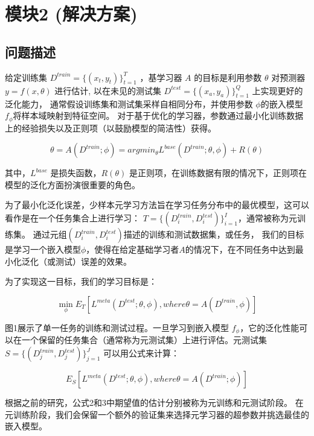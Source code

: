 \chapter{模块2 (解决方案)}


\section{问题描述}

给定训练集 $D^{train} = \{(x_t,y_t)\}^{T}_{t=1}$ ，基学习器 $A$ 的目标是利用参数 $\theta$ 对预测器 $y=f(x,\theta)$ 进行估计,
以在未见的测试集 $D^{test} = \{(x_a, y_a)\}^{Q}_{t=1}$ 上实现更好的泛化能力，
通常假设训练集和测试集采样自相同分布，并使用参数 $\phi$的嵌入模型$f_{\phi}$将样本域映射到特征空间。
对于基于优化的学习器，参数通过最小化训练数据上的经验损失以及正则项（以鼓励模型的简洁性）获得。

\begin{equation}
    \theta = A(D^{train}; \phi) = argmin_{\theta}L^{base}(D^{train}; \theta, \phi) + R(\theta)
\end{equation}

其中，$L^{base}$ 是损失函数，$R(\theta)$ 是正则项，在训练数据有限的情况下，正则项在模型的泛化方面扮演很重要的角色。

为了最小化泛化误差，少样本元学习方法旨在学习任务分布中的最优模型，这可以看作是在一个任务集合上进行学习：
$T = \{(D_{i}^{train}, D_{i}^{test})\}^{I}_{i=1}$，通常被称为元训练集。
通过元组$(D_i^{train}, D_i^{test})$描述的训练和测试数据集，或任务，
我们的目标是学习一个嵌入模型$\phi$，使得在给定基础学习者$A$的情况下，在不同任务中达到最小化泛化（或测试）误差的效果。

为了实现这一目标，我们的学习目标是：

\begin{equation}
    \min_{\phi} E_{T} [L^{meta}(D^{test}; \theta, \phi), where \theta = A(D^{train}, \phi)]
\end{equation}

图1展示了单一任务的训练和测试过程。一旦学习到嵌入模型 $f_{\phi}$，它的泛化性能可以在一个保留的任务集合（通常称为元测试集）上进行评估。元测试集 
$S = \{(D_j^{train}, D_j^{test})\}^J_{j=1}$ 可以用公式来计算：

\begin{equation}
    E_S[L^{meta}(D^{test}; \theta, \phi), where \theta = A(D^{train}; \phi)]
\end{equation}

根据之前的研究，公式2和3中期望值的估计分别被称为元训练和元测试阶段。
在元训练阶段，我们会保留一个额外的验证集来选择元学习器的超参数并挑选最佳的嵌入模型。

